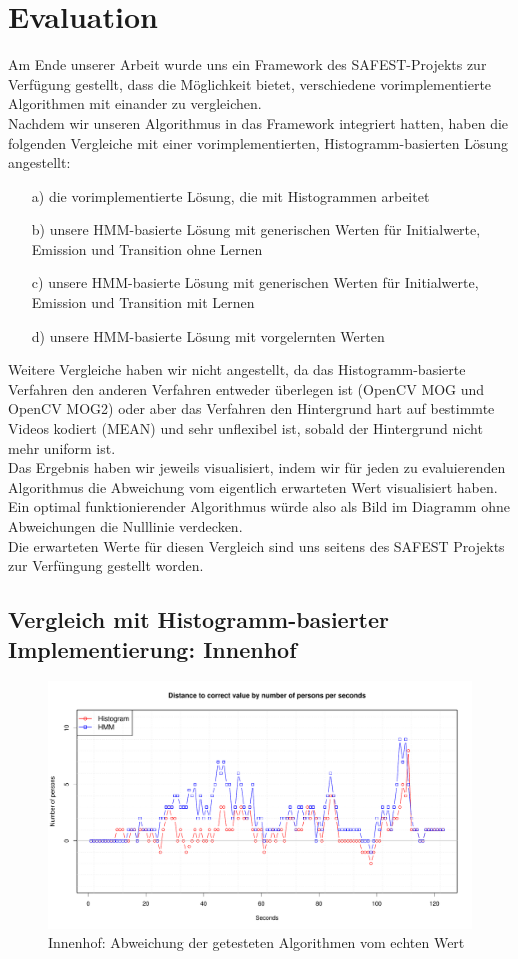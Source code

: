 \section{Evaluation}
\label{chap:evaluation}
Am Ende unserer Arbeit wurde uns ein Framework des SAFEST-Projekts zur Verfügung gestellt, dass die Möglichkeit bietet, verschiedene vorimplementierte Algorithmen mit einander zu vergleichen.\\
Nachdem wir unseren Algorithmus in das Framework integriert hatten, haben die folgenden Vergleiche mit einer vorimplementierten, Histogramm-basierten Lösung angestellt:
\begin{itemize}
	\item[a)] die vorimplementierte Lösung, die mit Histogrammen arbeitet
	\item[b)] unsere HMM-basierte Lösung mit generischen Werten für Initialwerte, Emission und Transition ohne Lernen
	\item[c)] unsere HMM-basierte Lösung mit generischen Werten für Initialwerte, Emission und Transition mit Lernen
	\item[d)] unsere HMM-basierte Lösung mit vorgelernten Werten
\end{itemize}
Weitere Vergleiche haben wir nicht angestellt, da das Histogramm-basierte Verfahren den anderen Verfahren entweder überlegen ist (OpenCV MOG und OpenCV MOG2) oder aber das Verfahren den Hintergrund hart auf bestimmte Videos kodiert (MEAN) und sehr unflexibel ist, sobald der Hintergrund nicht mehr uniform ist.\\
Das Ergebnis haben wir jeweils visualisiert, indem wir für jeden zu evaluierenden Algorithmus die Abweichung vom eigentlich erwarteten Wert visualisiert haben.
Ein optimal funktionierender Algorithmus würde also als Bild im Diagramm ohne Abweichungen die Nulllinie verdecken.\\
Die erwarteten Werte für diesen Vergleich sind uns seitens des SAFEST Projekts zur Verfüngung gestellt worden.
\subsection{Vergleich mit Histogramm-basierter Implementierung: Innenhof}
\label{sec:eval_innenhof}
\begin{figure}
	\centering
\includegraphics[width=1\textwidth]{bilder/safest_plot_tegel_7-55.pdf}
	\caption{Innenhof: Abweichung der getesteten Algorithmen vom echten Wert}
	\label{fig:Innenhof}
\end{figure}


